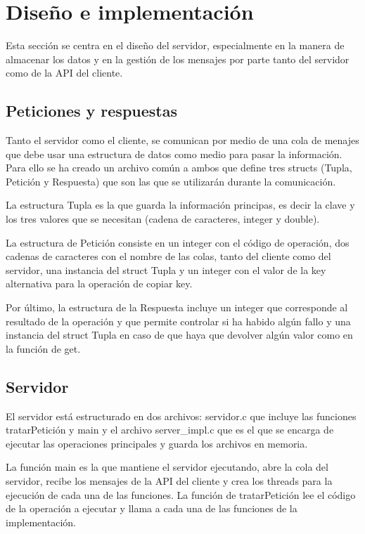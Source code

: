 \section{Diseño e implementación}
Esta sección se centra en el diseño del servidor, especialmente en la manera de almacenar los datos y en la gestión de los mensajes por parte tanto del servidor como de la API del cliente.

\subsection{Peticiones y respuestas}
Tanto el servidor como el cliente, se comunican por medio de una cola de menajes que debe usar una estructura de datos como medio para pasar la información. Para ello se ha creado un archivo común a ambos que define tres structs (Tupla, Petición y Respuesta) que son las que se utilizarán durante la comunicación.

La estructura Tupla es la que guarda la información principas, es decir la clave y los tres valores que se necesitan (cadena de caracteres, integer y double).

La estructura de Petición consiste en un integer con el código de operación, dos cadenas de caracteres con el nombre de las colas, tanto del cliente como del servidor, una instancia del struct Tupla y un integer con el valor de la key alternativa para la operación de copiar key.

Por último, la estructura de la Respuesta incluye un integer que corresponde al resultado de la operación y que permite controlar si ha habido algún fallo y una instancia del struct Tupla en caso de que haya que devolver algún valor como en la función de get.

\subsection{Servidor}
El servidor está estructurado en dos archivos: servidor.c que incluye las funciones tratarPetición y main y el archivo server\_impl.c que es el que se encarga de ejecutar las operaciones principales y guarda los archivos en memoria.

La función main es la que mantiene el servidor ejecutando, abre la cola del servidor, recibe los mensajes de la API del cliente y crea los threads para la ejecución de cada una de las funciones. La función de tratarPetición lee el código de la operación a ejecutar y llama a cada una de las funciones de la implementación.

